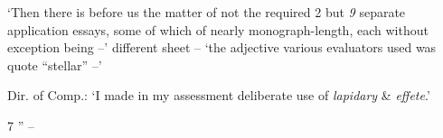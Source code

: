 \documentclass{article}
\numberwithin{equation}{section}
\begin{document}
`Then there is before us the matter of not the required 2 but \textit{9} separate application essays, some of which of nearly monograph-length, each without exception being --' different sheet -- `the adjective various evaluators used was quote ``stellar'' --'

Dir. of Comp.: `I made in my assessment deliberate use of \textit{lapidary} \& \textit{effete}.'

7
'' -- \cite[pp. 3--]{Wallace2011}


\printbibliography[heading=bibintoc]
	
\end{document}
